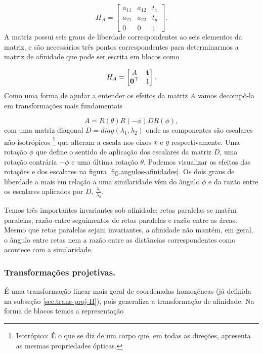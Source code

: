 \begin{equation*}
H_A=
\begin{bmatrix}
a_{11}&a_{12}&t_x\\
a_{21}&a_{22}&t_y\\
0&0&1
\end{bmatrix}.
\end{equation*}
A matriz possui seis graus de liberdade correspondentes ao seis elementos da matriz, e são necessários três pontos correspondentes para determinarmos a matriz de afinidade que pode ser escrita em blocos como

\begin{equation*}
H_A=
\begin{bmatrix}
A&{\bf t}\\
{\bf 0}^\top&1
\end{bmatrix}.
\end{equation*}
Como uma forma de ajudar a entender os efeitos da matriz $A$ vamos decompô-la em transformações mais fundamentais

\begin{equation*}
A=R(\theta)R(-\phi)DR(\phi),
\end{equation*}
com uma matriz diagonal $D=diag(\lambda_1, \lambda_2)$ onde as componentes são escalares não-isotrópicos \footnote{Isotrópico: É o que se diz de um corpo que, em todas as direções, apresenta as mesmas propriedades ópticas.} que alteram a escala nos eixos $x$ e $y$ respectivamente. Uma rotação $\phi$ que define o sentido de aplicação dos escalares da matriz $D$, uma rotação contrária $-\phi$ e uma última rotação $\theta$. Podemos visualizar os efeitos das rotações e dos escalares na figura \ref{fig.angulos-afinidades}. Os dois graus de liberdade a mais em relação a uma similaridade vêm do ângulo $\phi$ e da razão entre os escalares aplicados por $D$, $\frac{\lambda_1}{\lambda_2}$. 


Temos três importantes invariantes sob afinidade: retas paralelas se matêm paralelas, razão entre seguimentos de retas paralelas e razão entre as áreas. Mesmo que retas paralelas sejam invariantes, a afinidade não mantém, em geral, o ângulo entre retas nem a razão entre as distâncias correspondentes como acontece com a similaridade.

\subsubsection*{Transformações projetivas.}
É uma transformação linear mais geral de coordenadas homogêneas (já definida na subseção \ref{sec.trans-proj-H}), pois generaliza  a transformação de afinidade. Na forma de blocos temos a representação

